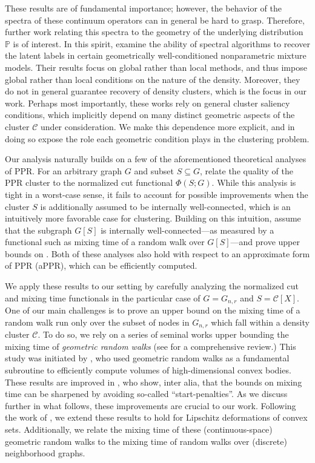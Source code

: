 \documentclass[11pt,twoside]{article}
\theoremstyle{definition}
\newcommand{\vol}{\mathrm{vol}}
\newcommand{\1}{\mathbbm{1}}
\newcommand{\Pbb}{\mathbb{P}}
\newcommand{\Cset}{\mathcal{C}}
\newcommand{\Cest}{\widehat{C}}
\begin{document}
These results are of fundamental importance; however, the behavior of the
spectra of these continuum operators can in general be hard to grasp. Therefore,
further work relating this spectra to the geometry of the underlying
distribution $\Pbb$ is of interest. In this spirit,
\citet{shi2009,schiebinger2015,garciatrillos19} examine the ability of spectral
algorithms to recover the latent labels in certain geometrically
well-conditioned nonparametric mixture models. Their results focus on global
rather than local methods, and thus impose global rather than local conditions
on the nature of the density. Moreover, they do not in general guarantee
recovery of density clusters, which is the focus in our work. Perhaps most
importantly, these works rely on general cluster saliency conditions, which
implicitly depend on many distinct geometric aspects of the cluster $\Cset$
under consideration. We make this dependence more explicit, and in doing so
expose the role each geometric condition plays in the clustering problem.

Our analysis naturally builds on a few of the aforementioned theoretical
analyses of PPR. For an arbitrary graph $G$ and subset $S \subseteq G$,
\citet{andersen2006} relate the quality of the PPR cluster \smash{$\Cest$} to
the normalized cut functional $\Phi(S;G)$. While this analysis is tight in a
worst-case sense, it fails to account for possible improvements when the cluster
$S$ is additionally assumed to be internally well-connected, which is an
intuitively more favorable case for clustering. Building on this intuition,  
\citet{zhu2013} assume that the subgraph $G[S]$ is internally
well-connected---as measured by a functional such as mixing time of a random
walk over $G[S]$---and prove upper bounds on \smash{$\vol(\Cest \vartriangle
  S;G)$}. Both of these analyses also hold with respect to an approximate form 
of PPR  (aPPR), which can be efficiently computed. 

We apply these results to our setting by carefully analyzing the normalized cut
and mixing time functionals in the particular case of $G = G_{n,r}$ and $S =
\Cset[X]$. One of our main challenges is to prove an upper bound on the mixing 
time of a random walk run only over the subset of nodes in $G_{n,r}$ which fall
within a density cluster $\Cset$. To do so, we rely on a series of seminal works
upper bounding the mixing time of \emph{geometric random walks} (see 
\citet{vempala2005} for a comprehensive review.)  This study was initiated by
\citet{dyer1991}, who used geometric random walks as a fundamental subroutine to
efficiently compute volumes of high-dimensional convex bodies. These results are
improved in \citet{lovasz1990,kannan97,kannan06}, who show, inter alia, that the
bounds on mixing time can be sharpened by avoiding so-called
``start-penalties''. As we discuss further in what follows, these improvements
are crucial to our work. Following the work of
\citet{abbasi-yadkori2016,abbasi-yadkori2016a}, we extend these results to hold
for Lipschitz deformations of convex sets. Additionally, we relate the mixing
time of these (continuous-space) geometric random walks to the mixing time of
random walks over (discrete) neighborhood graphs.
\end{document}
